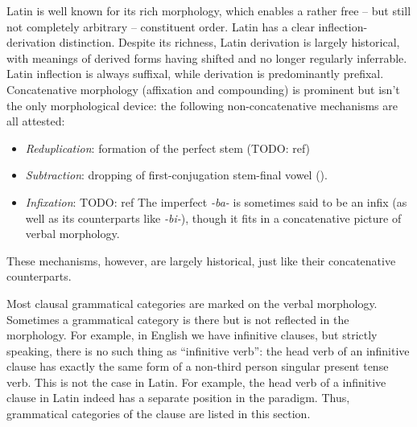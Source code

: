 \documentclass[a4paper, oneside]{report}
\newcommand{\form}[1]{\emph{#1}}
\begin{document}
Latin is well known for its rich morphology,
which enables a rather free -- but still not completely arbitrary -- constituent order.
Latin has a clear inflection-derivation distinction.
Despite its richness, 
Latin derivation is largely historical,
with meanings of derived forms 
having shifted and no longer regularly inferrable.
Latin inflection is always suffixal,
while derivation is predominantly prefixal.
Concatenative morphology (affixation and compounding) 
is prominent but isn't the only morphological device:
the following non-concatenative mechanisms are all attested:
\begin{itemize}
    \item \emph{Reduplication}: formation of the perfect stem (TODO: ref)
    \item \emph{Subtraction}: dropping of first-conjugation stem-final vowel ().
    \item \emph{Infixation}:   TODO: ref 
    The imperfect \form{-ba-} is sometimes said to be an infix 
    (as well as its counterparts like \form{-bi-}),
    though it fits in a concatenative picture of verbal morphology.
\end{itemize}
These mechanisms, however, are largely historical,
just like their concatenative counterparts.

Most clausal grammatical categories are marked on the verbal morphology.
Sometimes a grammatical category is there but is not reflected in the morphology.
For example, in English we have infinitive clauses,
but strictly speaking, there is no such thing as ``infinitive verb'':
the head verb of an infinitive clause 
has exactly the same form of a non-third person singular present tense verb.
This is not the case in Latin.
For example, the head verb of a infinitive clause in Latin 
indeed has a separate position in the paradigm.
Thus, grammatical categories of the clause are listed in this section.
\end{document}
